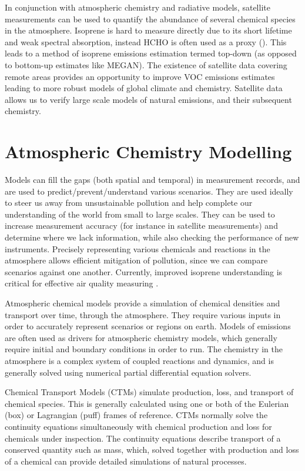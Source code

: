     In conjunction with atmospheric chemistry and radiative models, satellite measurements can be used to quantify the abundance of several chemical species in the atmosphere.
    Isoprene is hard to measure directly due to its short lifetime and weak spectral absorption, instead HCHO is often used as a proxy (\cite{Millet2006, Fu2007, Dufour2009, Marais2012, bauwens2013satellite, Kefauver2014, Bauwens2016}).
    This leads to a method of isoprene emissions estimation termed top-down (as opposed to bottom-up estimates like MEGAN).
    The existence of satellite data covering remote areas provides an opportunity to improve VOC emissions estimates leading to more robust models of global climate and chemistry. 
    Satellite data allows us to verify large scale models of natural emissions, and their subsequent chemistry.
  

  
\section{Atmospheric Chemistry Modelling}
\label{LR:Models}
  
  Models can fill the gaps (both spatial and temporal) in measurement records, and are used to predict/prevent/understand various scenarios.
  They are used ideally to steer us away from unsustainable pollution and help complete our understanding of the world from small to large scales.
  They can be used to increase measurement accuracy (for instance in satellite measurements) and determine where we lack information, while also checking the performance of new instruments.
  Precisely representing various chemicals and reactions in the atmosphere allows efficient mitigation of pollution, since we can compare scenarios against one another.
  Currently, improved isoprene understanding is critical for effective air quality measuring \citep{Marvin2017}.
  
  Atmospheric chemical models provide a simulation of chemical densities and transport over time, through the atmosphere.
  They require various inputs in order to accurately represent scenarios or regions on earth.
  Models of emissions are often used as drivers for atmospheric chemistry models, which generally require initial and boundary conditions in order to run.
  The chemistry in the atmosphere is a complex system of coupled reactions and dynamics, and is generally solved using numerical partial differential equation solvers.
  
  Chemical Transport Models (CTMs) simulate production, loss, and transport of chemical species.
  This is generally calculated using one or both of the Eulerian (box) or Lagrangian (puff) frames of reference.
  CTMs normally solve the continuity equations simultaneously with chemical production and loss for chemicals under inspection.
  The continuity equations describe transport of a conserved quantity such as mass, which, solved together with production and loss of a chemical can provide detailed simulations of natural processes.
  
